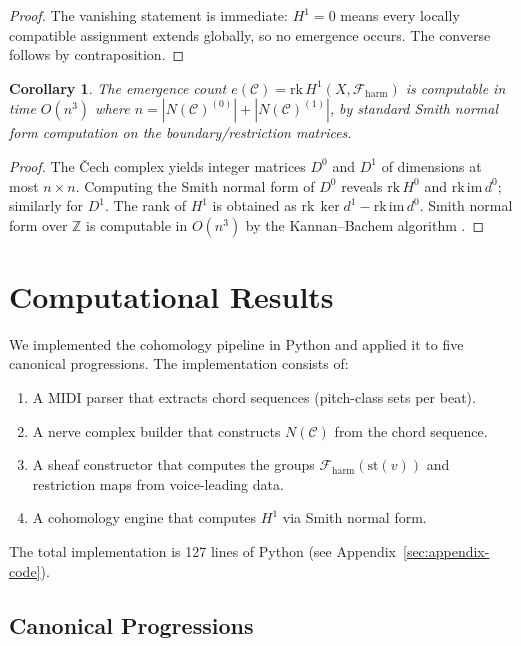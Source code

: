 \documentclass[12pt,a4paper]{article}
\newtheorem{corollary}[theorem]{Corollary}
\newcommand{\ZZ}{\mathbb{Z}}
\newcommand{\Hone}{H^{1}}
\newcommand{\Hzero}{H^{0}}
\newcommand{\sheaf}{\mathscr{F}}
\begin{document}
\begin{proof}
  The vanishing statement is immediate: $\Hone = 0$ means every locally compatible assignment 
  extends globally, so no emergence occurs. The converse follows by contraposition.
\end{proof}

\begin{corollary}\label{cor:computable}
  The emergence count $e(\mathcal{C}) = \mathrm{rk}\, \Hone(X, \sheaf_{\mathrm{harm}})$ 
  is computable in time $O(n^3)$ where $n = |N(\mathcal{C})^{(0)}| + |N(\mathcal{C})^{(1)}|$, 
  by standard Smith normal form computation on the boundary/restriction matrices.
\end{corollary}

\begin{proof}
  The \v{C}ech complex yields integer matrices $D^0$ and $D^1$ of dimensions at most 
  $n \times n$. Computing the Smith normal form of $D^0$ reveals $\mathrm{rk}\, \Hzero$ 
  and $\mathrm{rk}\, \mathrm{im}\, d^0$; similarly for $D^1$. The rank of $\Hone$ is 
  obtained as $\mathrm{rk}\, \ker d^1 - \mathrm{rk}\, \mathrm{im}\, d^0$. Smith normal 
  form over $\ZZ$ is computable in $O(n^3)$ by the Kannan--Bachem algorithm 
  \cite{kannan1979}.
\end{proof}

\section{Computational Results}\label{sec:results}

We implemented the cohomology pipeline in Python and applied it to five canonical progressions. 
The implementation consists of:
\begin{enumerate}
  \item A MIDI parser that extracts chord sequences (pitch-class sets per beat).
  \item A nerve complex builder that constructs $N(\mathcal{C})$ from the chord sequence.
  \item A sheaf constructor that computes the groups $\sheaf_{\mathrm{harm}}(\mathrm{st}(v))$ 
    and restriction maps from voice-leading data.
  \item A cohomology engine that computes $\Hone$ via Smith normal form.
\end{enumerate}

The total implementation is 127 lines of Python (see Appendix~\ref{sec:appendix-code}).

\subsection{Canonical Progressions}
\end{document}
